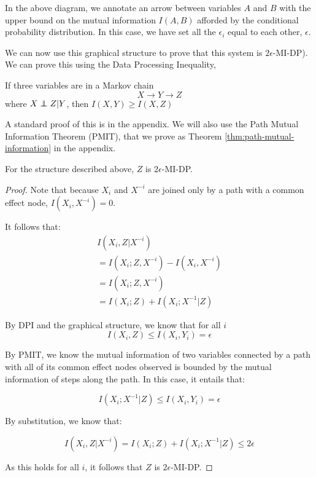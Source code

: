 \documentclass[../thesis.tex]{subfiles}
\begin{document}
In the above diagram, we annotate an arrow between
variables $A$ and $B$ with the upper bound on the
mutual information $I(A,B)$ afforded by the conditional
probability distribution. In this case, we
have set all the $\epsilon_i$ equal to each other,
$\epsilon$.

We can now use this graphical structure to prove
that this system is $2\epsilon$-MI-DP).
We can prove this using the Data Processing Inequality,

\begin{prp}
  If three variables are in a Markov chain
  $$X \rightarrow Y \rightarrow Z$$
  where $X \independent Z \vert Y$, then $I(X,Y) \geq I(X,Z)$
\end{prp}

A standard proof of this is in the appendix.
We will also use the Path Mutual Information Theorem (PMIT),
that we prove as Theorem \ref{thm:path-mutual-information} in
the appendix.

\begin{exm}
  For the structure described above,
  $Z$ is $2\epsilon$-MI-DP.
\end{exm}

\begin{proof}
  Note that because $X_i$ and $X^{-i}$
  are joined only by a path with a common
  effect node, $I(X_i,X^{-i}) = 0$.

  It follows that:
  \begin{equation}
    \begin{split}
      I(X_i, Z \vert X^{-i})\\
      = I(X_i;Z,X^{-i}) - I(X_i,X^{-i}) \\
      = I(X_i;Z,X^{-i}) \\
      = I(X_i;Z) + I(X_i;X^{-1} \vert Z)
    \end{split}
  \end{equation}

  By DPI and the graphical structure,
  we know that for all $i$
  $$I(X_i,Z) \leq I(X_i,Y_i) = \epsilon$$

  By PMIT, we know the mutual information of
  two variables connected by a path with all
  of its common effect nodes observed is bounded
  by the mutual information of steps along the path.
  In this case, it entails that:

  $$I(X_i;X^{-1} \vert Z) \leq I(X_i,Y_i) = \epsilon$$

  By substitution, we know that:

  $$I(X_i, Z \vert X^{-i}) = I(X_i;Z) + I(X_i;X^{-1} \vert Z) \leq 2\epsilon$$

  As this holds for all $i$, it follows that $Z$ is $2\epsilon$-MI-DP.
\end{proof}
\end{document}
